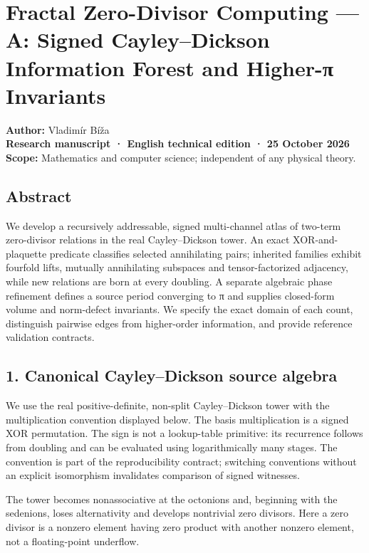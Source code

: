 \documentclass[
  10pt,
]{article}
\author{}
\date{}
\begin{document}
{
\setcounter{tocdepth}{3}
\tableofcontents
}
\section{Fractal Zero-Divisor Computing --- A: Signed Cayley--Dickson
Information Forest and Higher-π
Invariants}\label{fractal-zero-divisor-computing-a-signed-cayleydickson-information-forest-and-higher-ux3c0-invariants}

\textbf{Author:} Vladimír Bíža\\
\textbf{Research manuscript · English technical edition · 25 October
2026}\\
\textbf{Scope:} Mathematics and computer science; independent of any
physical theory.

\subsection{Abstract}\label{abstract}

We develop a recursively addressable, signed multi-channel atlas of
two-term zero-divisor relations in the real Cayley--Dickson tower. An
exact XOR-and-plaquette predicate classifies selected annihilating
pairs; inherited families exhibit fourfold lifts, mutually annihilating
subspaces and tensor-factorized adjacency, while new relations are born
at every doubling. A separate algebraic phase refinement defines a
source period converging to π and supplies closed-form volume and
norm-defect invariants. We specify the exact domain of each count,
distinguish pairwise edges from higher-order information, and provide
reference validation contracts.

\subsection{1. Canonical Cayley--Dickson source
algebra}\label{canonical-cayleydickson-source-algebra}

We use the real positive-definite, non-split Cayley--Dickson tower with
the multiplication convention displayed below. The basis multiplication
is a signed XOR permutation. The sign is not a lookup-table primitive:
its recurrence follows from doubling and can be evaluated using
logarithmically many stages. The convention is part of the
reproducibility contract; switching conventions without an explicit
isomorphism invalidates comparison of signed witnesses.

The tower becomes nonassociative at the octonions and, beginning with
the sedenions, loses alternativity and develops nontrivial zero
divisors. Here a zero divisor is a nonzero element having zero product
with another nonzero element, not a floating-point underflow.
\end{document}
